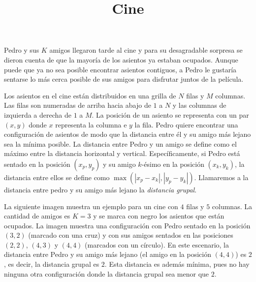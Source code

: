 \documentclass{oci}
\title{Cine}
\begin{document}
\begin{problemDescription}
    Pedro y sus $K$ amigos llegaron tarde al cine y
    para su desagradable sorpresa se dieron cuenta
    de que la mayoría de los asientos ya estaban ocupados.
    Aunque puede que ya no sea posible encontrar
    asientos contiguos, a Pedro le gustaría sentarse
    lo más cerca posible de sus amigos para disfrutar
    juntos de la película.

    Los asientos en el cine están distribuidos en una
    grilla de $N$ filas y $M$ columnas.
    Las filas son numeradas de arriba hacia abajo
    de $1$ a $N$ y las columnas de izquierda a derecha
    de $1$ a $M$.
    La posición de un asiento se representa con un par
    $(x, y)$ donde $x$ representa la columna e $y$ la fila.
    Pedro quiere encontrar una configuración de asientos
    de modo que la distancia entre él y su amigo más
    lejano sea la mínima posible.
    La distancia entre Pedro y un amigo se define
    como el máximo entre la distancia horizontal y vertical.
    Específicamente, si Pedro está sentado en la posición
    $(x_p, y_p)$ y su amigo $k$-ésimo en la posición
    $(x_k, y_k)$, la distancia entre ellos se define como
    $\max(|x_p - x_k|, |y_p - y_k|)$.
    Llamaremos a la distancia entre pedro y su amigo más
    lejano la \emph{distancia grupal}.

    La siguiente imagen muestra un ejemplo para un cine
    con $4$ filas y $5$ columnas.
    La cantidad de amigos es $K=3$ y se marca con negro
    los asientos que están ocupados.
    La imagen muestra una configuración con Pedro sentado en
    la posición $(3, 2)$ (marcado con una cruz) y
    con sus amigos sentados en las posiciones $(2, 2)$, $(4, 3)$ y $(4, 4)$
    (marcados con un círculo).
    En este escenario, la distancia entre Pedro y su amigo
    más lejano (el amigo en la posición $(4, 4)$) es $2$,
    es decir, la distancia grupal es $2$.
    Esta distancia es además mínima, pues no hay ninguna
    otra configuración donde la distancia grupal
    sea menor que $2$.

    \begin{figure}[h]
        \centering
\end{figure}
\end{problemDescription}
\end{document}
